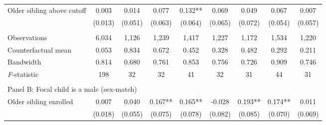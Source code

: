 \begin{table}[!htbp]
{{\begin{tabular}{lcccccccc}
Older sibling above cutoff&       0.003   &       0.014   &       0.077   &       0.132** &       0.069   &       0.049   &       0.067   &       0.007   \\
                    &     (0.013)   &     (0.051)   &     (0.063)   &     (0.064)   &     (0.065)   &     (0.072)   &     (0.054)   &     (0.057)   \\
                    &               &               &               &               &               &               &               &               \\
Observations        &       6,034   &       1,126   &       1,239   &       1,417   &       1,227   &       1,172   &       1,534   &       1,220   \\
Counterfactual mean &       0.053   &       0.834   &       0.672   &       0.452   &       0.328   &       0.482   &       0.292   &       0.211   \\
Bandwidth           &       0.814   &       0.680   &       0.761   &       0.853   &       0.756   &       0.726   &       0.909   &       0.746   \\
\textit{F}-statistic&         198   &          32   &          32   &          41   &          32   &          31   &          44   &          31   \\
 
&  &  &  & & & & & \\
\multicolumn{10}{l}{Panel B: Focal child is a male (sex-match)} \\
Older sibling enrolled&       0.007   &       0.040   &       0.167** &       0.165** &      -0.028   &       0.193** &       0.174** &       0.011   \\
                    &     (0.018)   &     (0.055)   &     (0.075)   &     (0.078)   &     (0.082)   &     (0.085)   &     (0.070)   &     (0.069)   \\
 

\end{tabular}}}
\end{table}
